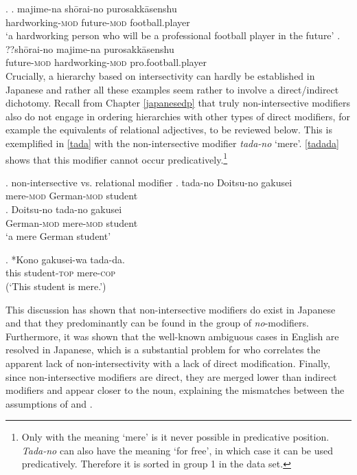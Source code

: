 \documentclass [output=book,colorlinks,citecolor=brown]{langscibook}
\begin{document}
\ex. \ag. majime-na shōrai-no purosakkāsenshu\\
hardworking-\textsc{mod} future-\textsc{mod} football.player\\
`a hardworking person who will be a professional football player in the future’
\bg. ??shōrai-no majime-na purosakkāsenshu\\
future-\textsc{mod} hardworking-\textsc{mod} pro.football.player\\

Crucially, a hierarchy based on intersectivity can hardly be established in Japanese and rather all these examples seem rather to involve a direct/indirect dichotomy. Recall from Chapter \ref{japanesedp} that truly non-intersective modifiers also do not engage in ordering hierarchies with other types of direct modifiers, for example the equivalents of relational adjectives, to be reviewed below. This is exemplified in \ref{tada} with the non-intersective modifier \textit{tada-no} `mere’. \ref{tadada} shows that this modifier cannot occur predicatively.\footnote{Only with the meaning `mere’ is it never possible in predicative position. \textit{Tada-no} can also have the meaning `for free’, in which case it can be used predicatively. Therefore it is sorted in group 1 in the data set.} %


\ex. \label{tada} non-intersective vs. relational modifier
\ag. tada-no Doitsu-no gakusei\\
mere-\textsc{mod} German-\textsc{mod} student \label{tada1}\\
\bg. Doitsu-no tada-no gakusei\\
German-\textsc{mod} mere-\textsc{mod} student\\
`a mere German student' \label{tada2}

\exg. *Kono gakusei-wa tada-da.\\
this student-\textsc{top} mere-\textsc{cop}\\
(`This student is mere.’) \label{tadada}

This discussion has shown that non-intersective modifiers do exist in Japanese and that they predominantly can be found in the group of \textit{no}-modifiers. Furthermore, it was shown that the well-known ambiguous cases in English are resolved in Japanese, which is a substantial problem for \citet{baker:2003:verbal} who correlates the apparent lack of non-intersectivity with a lack of direct modification. Finally, since non-intersective modifiers are direct, they are merged lower than indirect modifiers and appear closer to the noun, explaining the mismatches between the assumptions of \citet{svenonius:2008:position} and \citet{ayano:2010:revisiting}.
\end{document}

